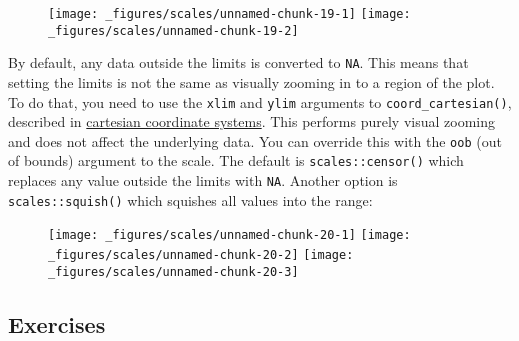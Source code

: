 \begin{figure}[H]
  \centering
  \texttt{[image: \_figures/scales/unnamed-chunk-19-1]}%
  \texttt{[image: \_figures/scales/unnamed-chunk-19-2]}
\end{figure}

By default, any data outside the limits is converted to \texttt{NA}.
This means that setting the limits is not the same as visually zooming
in to a region of the plot. To do that, you need to use the
\texttt{xlim} and \texttt{ylim} arguments to
\texttt{coord\_cartesian()}, described in
\protect\hyperlink{sub:cartesian}{cartesian coordinate systems}. This
performs purely visual zooming and does not affect the underlying data.
 You can override this with the \texttt{oob} (out of
bounds) argument to the scale. The default is \texttt{scales::censor()}
which replaces any value outside the limits with \texttt{NA}. Another
option is \texttt{scales::squish()} which squishes all values into the
range:

\begin{Shaded}
\begin{Highlighting}[]
\StringTok{ }\NormalTok{(} \NormalTok{:}\NormalTok{)}
\StringTok{ }\NormalTok{)) +}\StringTok{ }\NormalTok{(}\NormalTok{(}  \NormalTok{)}
\StringTok{ }\NormalTok{(} \NormalTok{(}\NormalTok{, }\NormalTok{))}
\StringTok{ }\NormalTok{(} \NormalTok{(}\NormalTok{, }\NormalTok{), } 
\end{Highlighting}
\end{Shaded}

\begin{figure}[H]
  \centering
  \texttt{[image: \_figures/scales/unnamed-chunk-20-1]}%
  \texttt{[image: \_figures/scales/unnamed-chunk-20-2]}%
  \texttt{[image: \_figures/scales/unnamed-chunk-20-3]}
\end{figure}

\subsection{Exercises}

